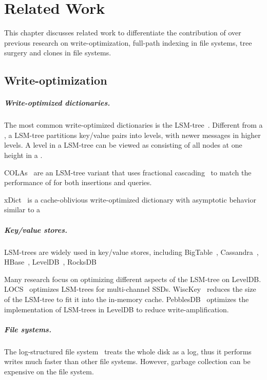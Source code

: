 \chapter{Related Work}
\label{chap:related}

This chapter discusses related work to differentiate the contribution of \betrfs
over previous research on write-optimization, full-path indexing in file
systems, tree surgery and clones in file systems.

\section{Write-optimization}

\paragraph{Write-optimized dictionaries.}
The most common write-optimized dictionaries is the LSM-tree~\citep{lsm}.
Different from a \bet, a LSM-tree partitions key/value pairs into levels, with
newer messages in higher levels.
A level in a LSM-tree can be viewed as consisting of all nodes at one height in
a \bet.

COLAs~\citep{cola} are an LSM-tree variant that uses fractional
cascading~\citep{fcascading} to match the performance of \bets for both
insertions and queries.

xDict~\citep{xdict} is a cache-oblivious write-optimized dictionary with
asymptotic behavior similar to a \bet

\paragraph{Key/value stores.}
LSM-trees are widely used in key/value stores, including
BigTable~\citep{bigtable}, Cassandra~\citep{cassandra}, HBase~\citep{hbase},
LevelDB~\citep{leveldb}, RocksDB~\citep{rocksdb}

Many research focus on optimizing different aspects of the LSM-tree on LevelDB.
LOCS~\citep{locs} optimizes LSM-trees for multi-channel SSDs.
WiscKey~\citep{wisckey} reduces the size of the LSM-tree to fit it into the
in-memory cache.
PebblesDB~\citep{pebble} optimizes the implementation of LSM-trees in LevelDB to
reduce write-amplification.

\paragraph{File systems.}
The log-structured file system~\citep{lfs} treats the whole disk as a log,
thus it performs writes much faster than other file systems.
However, garbage collection can be expensive on the file system.

